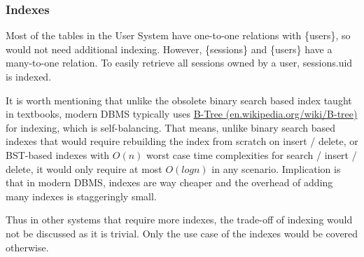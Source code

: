 \documentclass[12pt]{report}
\newcommand{\n}{\par}
\begin{document}
\subsubsection{Indexes} \label{data-layer.design.user-system.indexes}
Most of the tables in the User System have one-to-one relations with \{users\},
so would not need additional indexing.
However, \{sessions\} and \{users\} have a many-to-one relation.
To easily retrieve all sessions owned by a user, sessions.uid is indexed.\n
It is worth mentioning that unlike the obsolete binary search based index taught in textbooks,
modern DBMS typically uses \href{https://en.wikipedia.org/wiki/B-tree}{B-Tree (en.wikipedia.org/wiki/B-tree)} for indexing, which is self-balancing.
That means, unlike binary search based indexes that would require rebuilding the index from scratch on insert / delete,
or BST-based indexes with $O(n)$ worst case time complexities for search / insert / delete,
it would only require at most $O(logn)$ in any scenario.
Implication is that in modern DBMS, indexes are way cheaper and the overhead of adding many indexes is staggeringly small.\n
Thus in other systems that require more indexes, the trade-off of indexing would not be discussed as it is trivial.
Only the use case of the indexes would be covered otherwise.
\end{document}
